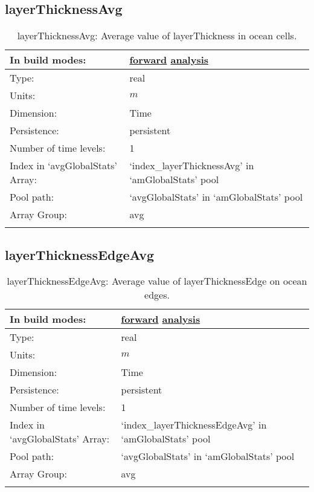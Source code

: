 \subsection[layerThicknessAvg]{layerThicknessAvg}
\label{subsec:var_sec_amGlobalStats_layerThicknessAvg}
\begin{center}
\begin{longtable}{| p{2.0in} | p{4.0in} |}
        \hline 
        In build modes: & \hyperref[subsec:forward_var_tab_amGlobalStats]{forward} \hyperref[subsec:analysis_var_tab_amGlobalStats]{analysis} \\
        \hline 
        Type: & real \\
        \hline 
        Units: & $m$ \\
        \hline 
        Dimension: & Time \\
        \hline 
        Persistence: & persistent \\
        \hline 
        Number of time levels: & 1 \\
        \hline 
		 Index in `avgGlobalStats' Array: & `index\_layerThicknessAvg' in `amGlobalStats' pool \\
		 \hline 
            Pool path: & `avgGlobalStats' in `amGlobalStats' pool \\
		 \hline 
		 Array Group: & avg \\
		 \hline 
    \caption{layerThicknessAvg: Average value of layerThickness in ocean cells.}
\end{longtable}
\end{center}
\subsection[layerThicknessEdgeAvg]{layerThicknessEdgeAvg}
\label{subsec:var_sec_amGlobalStats_layerThicknessEdgeAvg}
\begin{center}
\begin{longtable}{| p{2.0in} | p{4.0in} |}
        \hline 
        In build modes: & \hyperref[subsec:forward_var_tab_amGlobalStats]{forward} \hyperref[subsec:analysis_var_tab_amGlobalStats]{analysis} \\
        \hline 
        Type: & real \\
        \hline 
        Units: & $m$ \\
        \hline 
        Dimension: & Time \\
        \hline 
        Persistence: & persistent \\
        \hline 
        Number of time levels: & 1 \\
        \hline 
		 Index in `avgGlobalStats' Array: & `index\_layerThicknessEdgeAvg' in `amGlobalStats' pool \\
		 \hline 
            Pool path: & `avgGlobalStats' in `amGlobalStats' pool \\
		 \hline 
		 Array Group: & avg \\
		 \hline 
    \caption{layerThicknessEdgeAvg: Average value of layerThicknessEdge on ocean edges.}
\end{longtable}
\end{center}
